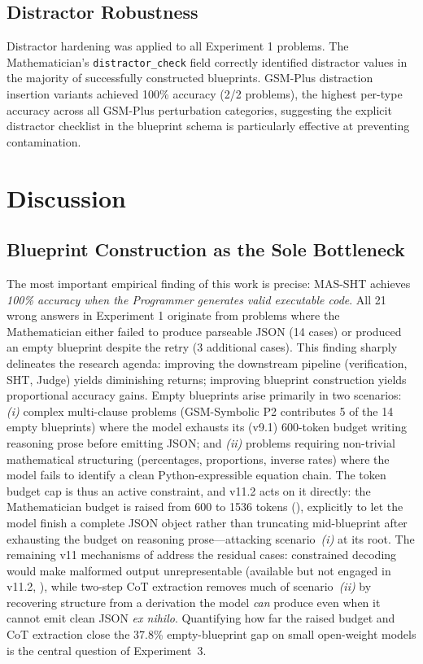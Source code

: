 \documentclass[11pt,a4paper]{article}
\begin{document}
\subsection{Distractor Robustness}
Distractor hardening was applied to all Experiment 1 problems.
The Mathematician's \texttt{distractor\_check} field correctly identified distractor values in the majority of successfully constructed blueprints.
GSM-Plus distraction insertion variants achieved 100\% accuracy (2/2 problems), the highest per-type accuracy across all GSM-Plus perturbation categories, suggesting the explicit distractor checklist in the blueprint schema is particularly effective at preventing contamination.
\section{Discussion}
\label{sec:discussion}
\subsection{Blueprint Construction as the Sole Bottleneck}
The most important empirical finding of this work is precise: MAS-SHT achieves \emph{100\% accuracy when the Programmer generates valid executable code}.
All 21 wrong answers in Experiment 1 originate from problems where the Mathematician either failed to produce parseable JSON (14 cases) or produced an empty blueprint despite the retry (3 additional cases).
This finding sharply delineates the research agenda: improving the downstream pipeline (verification, SHT, Judge) yields diminishing returns; improving blueprint construction yields proportional accuracy gains.
Empty blueprints arise primarily in two scenarios:
\textit{(i)} complex multi-clause problems (GSM-Symbolic P2 contributes 5 of the 14 empty blueprints) where the model exhausts its (v9.1) 600-token budget writing reasoning prose before emitting JSON; and
\textit{(ii)} problems requiring non-trivial mathematical structuring (percentages, proportions, inverse rates) where the model fails to identify a clean Python-expressible equation chain.
The token budget cap is thus an active constraint, and v11.2 acts on it directly: the Mathematician budget is raised from 600 to 1536 tokens (), explicitly to let the model finish a complete JSON object rather than truncating mid-blueprint after exhausting the budget on reasoning prose---attacking scenario~\textit{(i)} at its root.
The remaining v11 mechanisms of  address the residual cases: constrained decoding would make malformed output unrepresentable (available but not engaged in v11.2, ), while two-step CoT extraction removes much of scenario~\textit{(ii)} by recovering structure from a derivation the model \emph{can} produce even when it cannot emit clean JSON \emph{ex nihilo}. Quantifying how far the raised budget and CoT extraction close the 37.8\% empty-blueprint gap on small open-weight models is the central question of Experiment~3.
\end{document}
